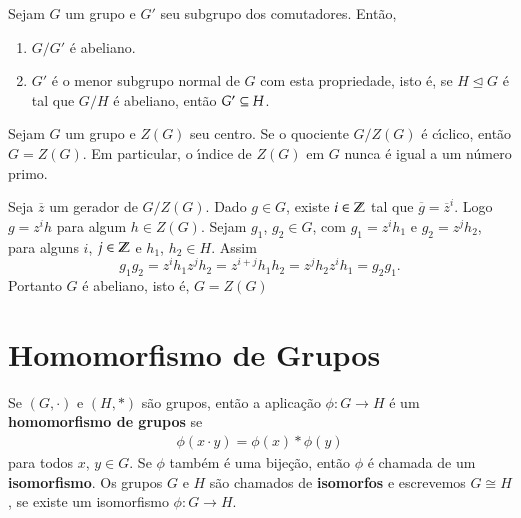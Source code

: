 \begin{proposicao}
	Sejam $G$ um grupo e $G'$ seu subgrupo dos comutadores. Ent\~ao,
	\begin{enumerate}[label=({\roman*})]
		\item $G/G'$ \'e abeliano.
		\item $G'$ \'e o menor subgrupo normal de $G$ com esta propriedade, isto \'e, se $H \unlhd G$ \'e tal que $G/H$ \'e abeliano, ent\~ao $G'\subseteq H$.
	\end{enumerate}
\end{proposicao}


\begin{proposicao}
	Sejam $G$ um grupo e $Z(G)$ seu centro. Se o quociente $G/Z(G)$ \'e c{\'\i}clico, ent\~ao $G = Z(G)$. Em particular, o {\'\i}ndice de $Z(G)$ em $G$ nunca \'e igual a um n\'umero primo.
\end{proposicao}
\begin{prova}
	Seja $\overline{z}$ um gerador de $G/Z(G)$. Dado $g \in G$, existe $i \in \mathbb{Z}$ tal que $\overline{g} = \overline{z}^i$. Logo $g = z^ih$ para algum $h \in Z(G)$. Sejam $g_1$, $g_2 \in G$, com $g_1 = z^ih_1$ e $g_2 = z^jh_2$, para alguns $i$, $j \in \mathbb{Z}$ e $h_1$, $h_2 \in H$. Assim
	\[
		g_1g_2 = z^ih_1z^jh_2 = z^{i+j}h_1h_2 = z^jh_2z^ih_1 = g_2g_1.
	\]
	Portanto $G$ \'e abeliano, isto \'e, $G = Z(G)$
\end{prova}


\section{Homomorfismo de Grupos} %
\label{sec:homomorfismo_de_grupos}

\begin{definicao}
	Se $(G,\cdot)$ e $(H,*)$ s\~ao grupos, ent\~ao a aplica\c{c}\~ao $\phi : G \to H$ \'e um \textbf{homomorfismo de grupos} se
	\begin{align}\label{definicao_homomorfismo}
		\phi(x\cdot y) = \phi(x)*\phi(y)
	\end{align}
	para todos $x$, $y \in G$. Se $\phi$ tamb\'em \'e uma bije\c{c}\~ao, ent\~ao $\phi$ \'e chamada de um \textbf{isomorfismo}. Os grupos $G$ e $H$ s\~ao chamados de \textbf{isomorfos} e escrevemos $G \cong H$, se existe um isomorfismo $\phi: G \to H$.
\end{definicao}

